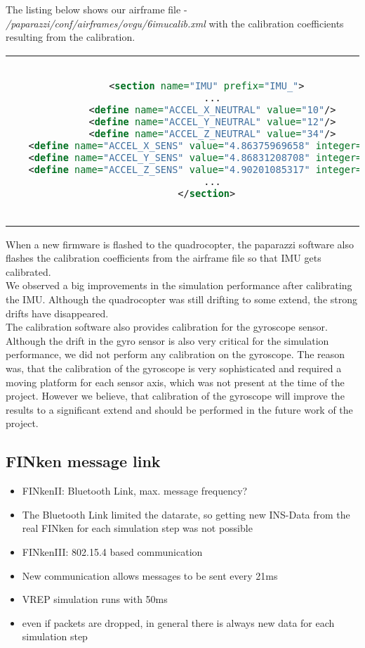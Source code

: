The listing below shows our airframe file - \textit{/paparazzi/conf/airframes/ovgu/6imucalib.xml} with the calibration coefficients resulting from the calibration.

\begin{center}
\begin{tabular}{c}
\begin{lstlisting}[basicstyle=\small, language=XML]

 <section name="IMU" prefix="IMU_">
   ...
   <define name="ACCEL_X_NEUTRAL" value="10"/>
   <define name="ACCEL_Y_NEUTRAL" value="12"/>
   <define name="ACCEL_Z_NEUTRAL" value="34"/>
   <define name="ACCEL_X_SENS" value="4.86375969658" integer="16"/>
   <define name="ACCEL_Y_SENS" value="4.86831208708" integer="16"/>
   <define name="ACCEL_Z_SENS" value="4.90201085317" integer="16"/>
   ...
 </section>
        
\end{lstlisting}
\end{tabular}
\end{center}

When a new firmware is flashed to the quadrocopter, the paparazzi software also flashes the calibration coefficients from the airframe file so that IMU gets calibrated. \\
We observed a big improvements in the simulation performance after calibrating the IMU. Although the quadrocopter was still drifting to some extend, the strong drifts have disappeared. \\
The calibration software also provides calibration for the gyroscope sensor. Although the drift in the gyro sensor is also very critical for the simulation performance, we did not perform any calibration on the gyroscope. The reason was, that the calibration of the gyroscope is very sophisticated and required a moving platform for each sensor axis, which was not present at the time of the project. However we believe, that calibration of the gyroscope will improve the results to a significant extend and should be performed in the future work of the project.


\subsection{FINken message link}
\label{sec:messLink}
\begin{itemize}
\item{FINkenII: Bluetooth Link, max. message frequency?}
\item{The Bluetooth Link limited the datarate, so getting new INS-Data from the real FINken for each simulation step was not possible}
\item{FINkenIII: 802.15.4 based communication}
\item{New communication allows messages to be sent every 21ms}
\item{VREP simulation runs with 50ms}
\item{even if packets are dropped, in general there is always new data for each simulation step}
\end{itemize}
